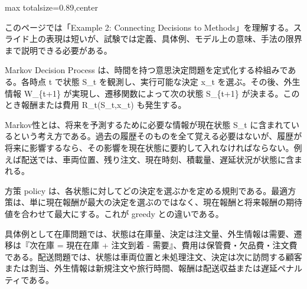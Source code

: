 \begin{minipage}[t]{0.58\textwidth}
\begin{adjustbox}{max totalsize={\textwidth}{0.89\textheight},center}
\begin{minipage}{\textwidth}\scriptsize
{}このページでは「Example 2: Connecting Decisions to Methods」を理解する。スライド上の表現は短いが、試験では定義、具体例、モデル上の意味、手法の限界まで説明できる必要がある。\par
Markov Decision Process は、時間を持つ意思決定問題を定式化する枠組みである。各時点 t で状態 S\_t を観測し、実行可能な決定 x\_t を選ぶ。その後、外生情報 W\_\{t+1\} が実現し、遷移関数によって次の状態 S\_\{t+1\} が決まる。このとき報酬または費用 R\_t(S\_t,x\_t) も発生する。\par
Markov性とは、将来を予測するために必要な情報が現在状態 S\_t に含まれているという考え方である。過去の履歴そのものを全て覚える必要はないが、履歴が将来に影響するなら、その影響を現在状態に要約して入れなければならない。例えば配送では、車両位置、残り注文、現在時刻、積載量、遅延状況が状態に含まれる。\par
方策 policy は、各状態に対してどの決定を選ぶかを定める規則である。最適方策は、単に現在報酬が最大の決定を選ぶのではなく、現在報酬と将来報酬の期待値を合わせて最大にする。これが greedy との違いである。\par
具体例として在庫問題では、状態は在庫量、決定は注文量、外生情報は需要、遷移は『次在庫 = 現在在庫 + 注文到着 - 需要』、費用は保管費・欠品費・注文費である。配送問題では、状態は車両位置と未処理注文、決定は次に訪問する顧客または割当、外生情報は新規注文や旅行時間、報酬は配送収益または遅延ペナルティである。\par

\end{minipage}
\end{adjustbox}
\end{minipage}
